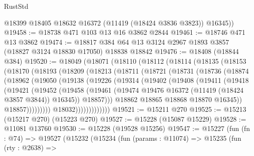 \begin{lexlean}{RustStd}
\begin{coremodule}
        @18399
        @18405
        @18632
        @16372
        (@11419 (@18424 @3836 @3823))
        @16345))
@19458 := @18738 @471 @103 @13 @16 @3862 @2844
@19461 := @18746 @471 @13 @3862
@19474 := @18817 @384 @64 @13 @3124 @2967 @1893 @3857 (@18827 @3124 @18830 @17050) @18838 @18842
@19476 := @18408 (@18844 @384)
@19520 := @18049
    (@18071
      (@18110
        (@18112
          (@18114
            (@18135
              (@18153
                (@18170
                  (@18193
                    (@18209
                      (@18213
                        (@18711
                          (@18721
                            (@18731
                              (@18736
                                (@18874
                                  (@18962
                                    (@19050
                                      (@19138
                                        (@19226
                                          (@19314
                                            (@19402
                                              (@19408
                                                (@19411
                                                  (@19418
                                                    (@19421
                                                      (@19452
                                                        (@19458
                                                          (@19461
                                                            (@19474
                                                              @19476
                                                              @16372
                                                              (@11419 (@18424 @3857 @3844))
                                                              @16345))
                                                          @18857)))
                                                    @18862
                                                    @18865
                                                    @18868
                                                    @18870
                                                    @16345))
                                                @18857)))))))))
                              @18032)))))))))))))
@19521 := @15211 @270
@19525 := @15213 (@15217 @270) (@15223 @270)
@19527 := @15228 (@15087 @15229)
@19528 := @11081 @13760
@19530 := @15228 (@19528 @15256)
@19547 := @15227
    (fun (fn : @74) =>
    @19527
      (@15232
        (@15234
          (fun (params : @11074) =>
          @15235
            (fun (rty : @2638) =>

\end{coremodule}
\end{lexlean}
